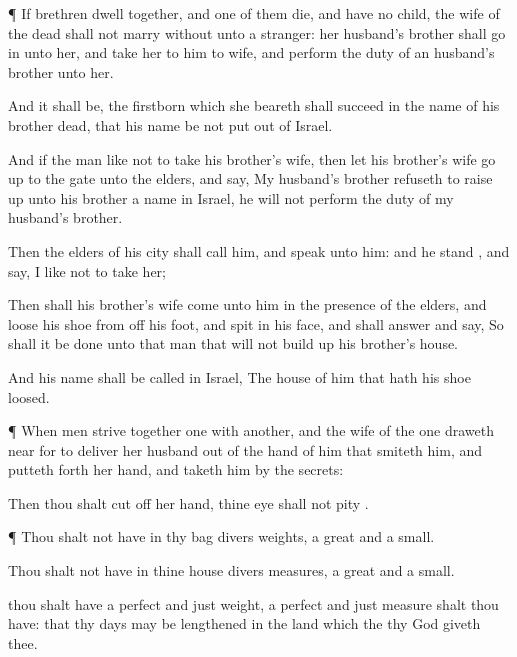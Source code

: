 {\par }{\PP {}¶ If
brethren
dwell
together, and
one of them
die, and have no
child, the
wife of the
dead shall not marry
without unto a
stranger: her
husband’s brother shall go
in unto her, and
take her to him to
wife, and perform the duty of an
husband’s brother unto her.

And it shall be,
{} the
firstborn which she
beareth shall
succeed in the
name of his
brother
{}
dead, that his
name be not put
out of
Israel.

And if the
man
like not to
take his
brother’s wife, then let his
brother’s wife go
up to the
gate unto the
elders, and
say, My
husband’s brother
refuseth to raise
up unto his
brother a
name in
Israel, he
will not perform the duty of my
husband’s brother.

Then the
elders of his
city shall
call him, and
speak unto him: and
{} he
stand
{}, and
say, I
like not to
take her;

Then shall his
brother’s wife
come unto him in the
presence of the
elders, and
loose his
shoe from off his
foot, and
spit in his
face, and shall
answer and
say, So shall it be
done unto that
man that will not build
up his
brother’s
house.

And his
name shall be
called in
Israel, The
house of him that hath his
shoe
loosed.


\par }{\PP {}¶ When
men
strive
together one with
another, and the
wife of the
one draweth
near for to
deliver her
husband out of the
hand of him that
smiteth him, and putteth
forth her
hand, and
taketh him by the
secrets:

Then thou shalt cut
off her
hand, thine
eye shall not
pity
{}.


\par }{\PP {}¶ Thou shalt not have in thy
bag divers
weights, a
great and a
small.

Thou shalt not have in thine
house divers
measures, a
great and a
small.

 thou shalt have a
perfect and
just
weight, a
perfect and
just
measure shalt thou have: that thy
days may be
lengthened in the
land which the
{} thy
God
giveth thee.

}
